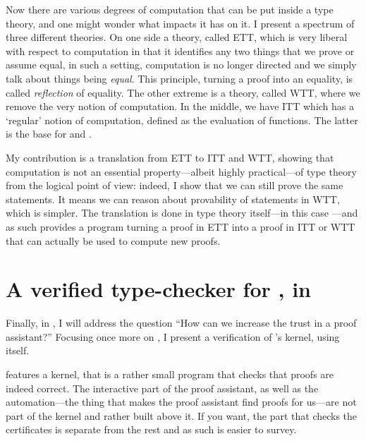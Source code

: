Now there are various degrees of computation that can be put inside a type
theory, and one might wonder what impacts it has on it. I present a spectrum
of three different theories. On one side a theory, called \acrfull{ETT},
which is very liberal with respect to computation in that it identifies any two
things that we prove or assume equal, in such a setting, computation is no
longer directed and we simply talk about things being \emph{equal}.
This principle, turning a proof into an equality, is called \emph{reflection} of
equality.
The other extreme is a theory, called \acrfull{WTT}, where we remove the very
notion of computation. In the middle, we have \acrfull{ITT} which has a
`regular' notion of computation, defined as the evaluation of functions. The
latter is the base for \Coq and \Agda.

My contribution is a translation from \acrshort{ETT} to \acrshort{ITT} and
\acrshort{WTT}, showing that computation is not an essential property---albeit
highly practical---of type theory from the logical point of view: indeed, I show
that we can still prove the same statements.
It means we can reason about provability of statements in \acrshort{WTT}, which
is simpler.
The translation is done in type theory itself---in this case \Coq---and as such
provides a program turning a proof in \acrshort{ETT} into a proof in
\acrshort{ITT} or \acrshort{WTT} that can actually be used to compute new
proofs.

\section{A verified type-checker for \Coq, in \Coq}

Finally, in , I will address the question ``How can we
increase the trust in a proof assistant?'' Focusing once more on \Coq, I present
a verification of \Coq's kernel, using \Coq itself.

\Coq features a kernel, that is a rather small program that checks that proofs
are indeed correct. The interactive part of the proof assistant, as well as the
automation---\ie the thing that makes the proof assistant find proofs for
us---are not part of the kernel and rather built above it.
If you want, the part that checks the certificates is separate from the rest
and as such is easier to survey.

